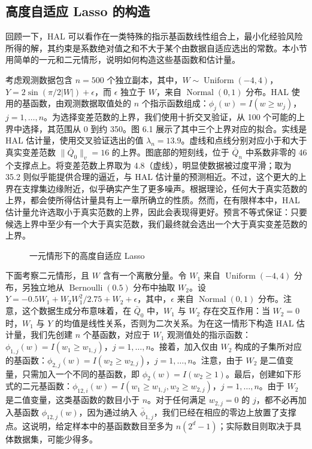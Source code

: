 \subsection{高度自适应 Lasso 的构造}
\label{subsec:ch06-constructing-hal}

回顾一下，HAL 可以看作在一类特殊的指示基函数线性组合上，最小化经验风险所得的解，其约束是系数绝对值之和不大于某个由数据自适应选出的常数。本小节用简单的一元和二元情形，说明如何构造这些基函数和估计量。

考虑观测数据包含 $n=500$ 个独立副本，其中，$W\sim\operatorname{Uniform}(-4,4)$，$Y=2\sin(\pi/2|W|)+\epsilon$，而 $\epsilon$ 独立于 $W$，来自 $\operatorname{Normal}(0,1)$ 分布。HAL 使用的基函数，由观测数据取值处的 $n$ 个指示函数组成：$\phi_j(w)=I(w\geq w_j)$，$j=1,\ldots,n$。为选择变差范数的上界，我们使用十折交叉验证，从 100 个可能的上界中选择，其范围从 0 到约 350。图 6.1 展示了其中三个上界对应的拟合。实线是 HAL 估计量，使用交叉验证选出的值 $\lambda_n=13.9$。虚线和点线分别对应小于和大于真实变差范数 $\|\bar Q_0\|_v=16$ 的上界。图底部的短刻线，位于 $\bar Q_n$ 中系数非零的 46 个支撑点上。将变差范数上界取为 4.8（虚线），明显使数据被过度平滑；取为 35.2 则似乎能提供合理的逼近，与 HAL 估计量的预测相近。不过，这个更大的上界在支撑集边缘附近，似乎确实产生了更多噪声。根据理论，任何大于真实范数的上界，都会使所得估计量具有上一章所确立的性质。然而，在有限样本中，HAL 估计量允许选取小于真实范数的上界，因此会表现得更好。预言不等式保证：只要候选上界中至少有一个大于真实范数，我们最终就会选出一个大于真实变差范数的上界。

\begin{figure}[htbp]
 \centering
 
 \caption{一元情形下的高度自适应 Lasso}
 \label{fig:ch06-hal-univariate}
\end{figure}
\FloatBarrier

下面考察二元情形，且 $W$ 含有一个离散分量。令 $W_1$ 来自 $\operatorname{Uniform}(-4,4)$ 分布，另独立地从 $\operatorname{Bernoulli}(0.5)$ 分布中抽取 $W_2$。设 $Y=-0.5W_1+W_2W_1^2/2.75+W_2+\epsilon$，其中，$\epsilon$ 来自 $\operatorname{Normal}(0,1)$ 分布。注意，这个数据生成分布意味着，在 $\bar Q_0$ 中，$W_1$ 与 $W_2$ 存在交互作用：当 $W_2=0$ 时，$W_1$ 与 $Y$ 的均值是线性关系，否则为二次关系。为在这一情形下构造 HAL 估计量，我们先创建 $n$ 个基函数，对应于 $W_1$ 观测值处的指示函数：$\phi_{1,j}(w)=I(w_1\geq w_{1,j})$，$j=1,\ldots,n$。接着，加入仅由 $W_2$ 构成的子集所对应的基函数：$\phi_{2,j}(w)=I(w_2\geq w_{2,j})$，$j=1,\ldots,n$。注意，由于 $W_2$ 是二值变量，只需加入一个不同的基函数，即 $\phi_2(w)=I(w_2\geq1)$。最后，创建如下形式的二元基函数：$\phi_{12,i}(w)=I(w_1\geq w_{1,j},w_2\geq w_{2,j})$，$j=1,\ldots,n$。由于 $W_2$ 是二值变量，这类基函数的数目小于 $n$。对于任何满足 $w_{2,j}=0$ 的 $j$，都不必再加入基函数 $\phi_{12,j}(w)$，因为通过纳入 $\bar\phi_{1,j}$，我们已经在相应的零边上放置了支撑点。这说明，给定样本中的基函数数目至多为 $n(2^d-1)$；实际数目则取决于具体数据集，可能少得多。

